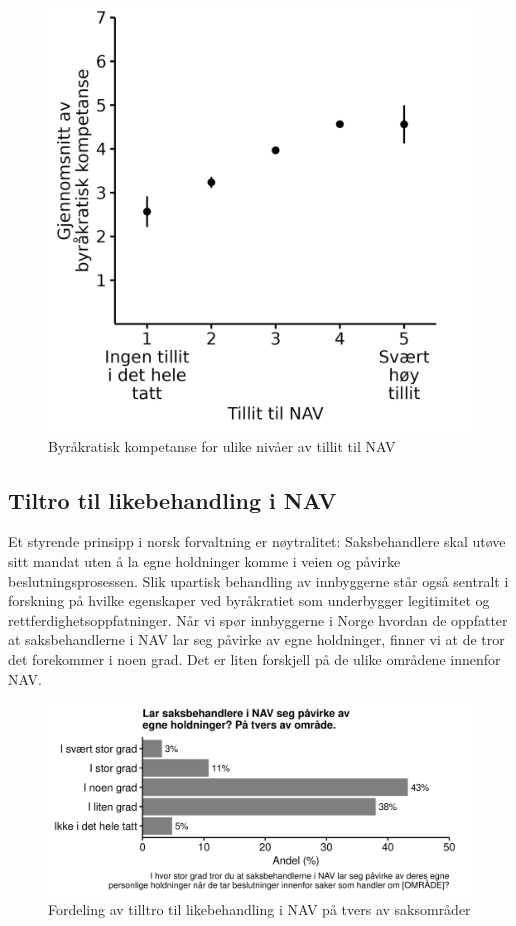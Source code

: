 \documentclass[
  12pt,
  a4paper, 12pt]{article}
\begin{document}
\begin{figure}

{\centering \includegraphics[width=0.6\linewidth]{figs/png/fig_be_by_navtrust} 

}

\caption{Byråkratisk kompetanse for ulike nivåer av tillit til NAV}\label{fig:unnamed-chunk-11}
\end{figure}

\hypertarget{tiltro-til-likebehandling-i-nav}{%
\subsection{Tiltro til likebehandling i NAV}\label{tiltro-til-likebehandling-i-nav}}

Et styrende prinsipp i norsk forvaltning er nøytralitet:
Saksbehandlere skal utøve sitt mandat uten å la egne holdninger komme i veien og påvirke beslutningsprosessen.
Slik upartisk behandling av innbyggerne står også sentralt i forskning på hvilke egenskaper ved byråkratiet som underbygger legitimitet og rettferdighetsoppfatninger.
Når vi spør innbyggerne i Norge hvordan de oppfatter at saksbehandlerne i NAV lar seg påvirke av egne holdninger, finner vi at de tror det forekommer i noen grad.
Det er liten forskjell på de ulike områdene innenfor NAV.

\begin{figure}

{\centering \includegraphics[width=0.8\linewidth]{figs/png/fig_nav_exp_attinfluence_all} 

}

\caption{Fordeling av tilltro til likebehandling i NAV på tvers av saksområder}\label{fig:unnamed-chunk-12}
\end{figure}
\end{document}

